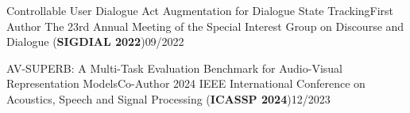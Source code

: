     \resumeSubheading
      {Controllable User Dialogue Act Augmentation for Dialogue State Tracking}{First Author}
      {The 23rd Annual Meeting of the Special Interest Group on Discourse and Dialogue (\textbf{SIGDIAL 2022})}{09/2022}
      \vspace{-3pt}

      \resumeSubheading
      {AV-SUPERB: A Multi-Task Evaluation Benchmark for Audio-Visual Representation Models}{Co-Author}
      {2024 IEEE International Conference on Acoustics, Speech and Signal Processing (\textbf{ICASSP 2024})}{12/2023}

      \vspace{-3pt}


\resumeSubHeadingListEnd